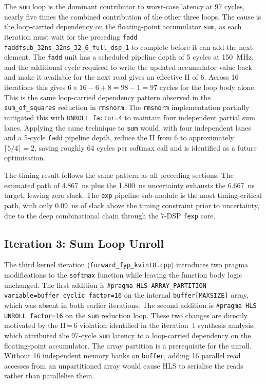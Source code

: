 The \texttt{sum} loop is the dominant contributor to worst-case
latency at 97 cycles, nearly five times the combined contribution of
the other three loops. The cause is the loop-carried dependency on the
floating-point accumulator \texttt{sum}, as each iteration must wait for
the preceding \texttt{fadd} \texttt{faddfsub\_32ns\_32ns\_32\_6\_full\_dsp\_1}
to complete before it can add the next
element. The \texttt{fadd} unit has a scheduled pipeline depth of 5 cycles at
\SI{150}{\mega\hertz}, and the additional cycle required to write the
updated accumulator value back and make it available for the next
read gives an effective II of 6. Across 16 iterations this gives $6 \times 16 - 6 + 8 =
98 - 1 = 97$ cycles for the loop body alone. This is the same
loop-carried dependency pattern observed in the
\texttt{sum\_of\_squares} reduction in \texttt{rmsnorm}. The
\texttt{rmsnorm} implementation partially mitigated this with
\texttt{UNROLL factor=4} to maintain four independent partial sum
lanes. Applying the same technique to \texttt{sum} would, with four
independent lanes and a 5-cycle \texttt{fadd} pipeline depth, reduce the
II from 6 to approximately $\lceil 5/4 \rceil = 2$, saving roughly 64 cycles per softmax
call and is identified as a future optimisation.

The timing result follows the same pattern as all preceding sections.
The estimated path of \SI{4.867}{\nano\second} plus the
\SI{1.800}{\nano\second} uncertainty exhausts the
\SI{6.667}{\nano\second} target, leaving zero slack. The \texttt{exp}
pipeline sub-module is the most timing-critical path, with only
\SI{0.09}{\nano\second} of slack above the timing constraint prior to
uncertainty, due to the deep combinational chain through the 7-DSP
\texttt{fexp} core.

\subsection{Iteration 3: Sum Loop Unroll}
\label{subsec:softmax_iter3}

The third kernel iteration (\texttt{forward\_fyp\_kvint8.cpp}) introduces
two pragma modifications to the \texttt{softmax} function while leaving
the function body logic unchanged. The first addition is
\texttt{\#pragma HLS ARRAY\_PARTITION variable=buffer cyclic factor=16}
on the internal \texttt{buffer[MAXSIZE]} array, which was absent in both
earlier iterations. The second addition is \texttt{\#pragma HLS UNROLL
factor=16} on the \texttt{sum} reduction loop. These two changes are
directly motivated by the II\,=\,6 violation identified in the
iteration~1 synthesis analysis, which attributed the 97-cycle \texttt{sum}
latency to a loop-carried dependency on the floating-point accumulator.
The array partition is a prerequisite for the unroll. Without 16
independent memory banks on \texttt{buffer}, adding 16 parallel read
accesses from an unpartitioned array would cause HLS to serialise the
reads rather than parallelise them.

